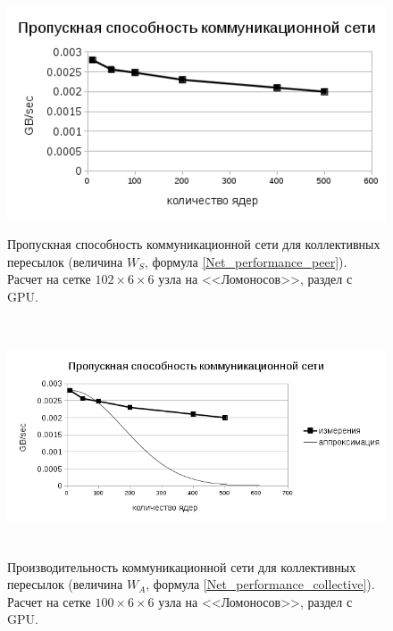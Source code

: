 \begin{figure}[h]
	
	
	\begin{center}
		\includegraphics[height=7cm,keepaspectratio]{images/W_A_Lomonosov_on_weak_eff.png}
		\caption{
			Пропускная способность коммуникационной сети для коллективных пересылок (величина $W_S$, формула \ref{Net_performance_peer}). Расчет на сетке $102 \times 6 \times 6$ узла на <<Ломоносов>>, раздел с GPU. 
		}
		\label{scale_W_A_Lomonosov_GPU_exp_fit}
	\end{center} 
\end{figure}

\begin{figure}[h]
	
	
	\begin{center}
		\includegraphics[height=7cm,keepaspectratio]{images/W_A_Lomonosov_Gauss.png}
		\caption{
				Производительность коммуникационной сети для коллективных пересылок (величина $W_A$, формула \ref{Net_performance_collective}). Расчет на сетке $100 \times 6 \times 6$ узла на <<Ломоносов>>, раздел с GPU. 
		}
		\label{scale_W_A_Lomonosov}
	\end{center} 
\end{figure}


